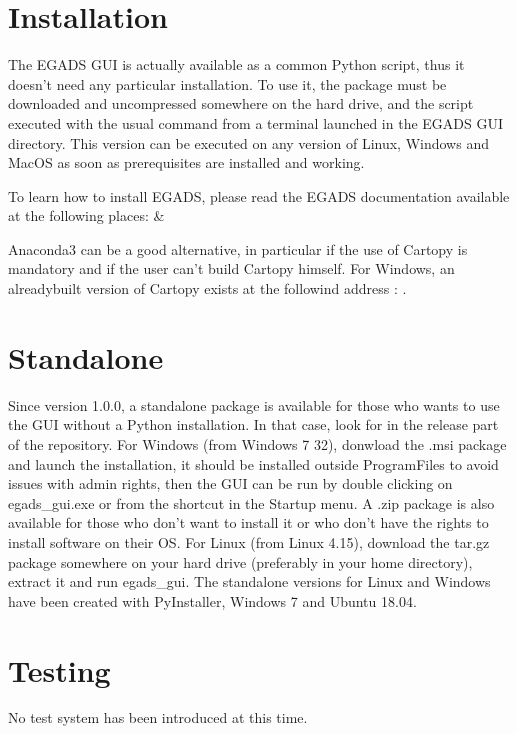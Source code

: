 \documentclass[a4paper,10pt,openany,english]{sphinxmanual}
\begin{document}
\section{Installation}
\label{\detokenize{install:id1}}
The EGADS GUI is actually available as a common Python script, thus it doesn’t need any particular installation. To use it, the package must be downloaded and uncompressed somewhere on the hard drive, and the script executed with the usual command  from a terminal launched in the EGADS GUI directory. This version can be executed on any version of Linux, Windows and MacOS as soon as prerequisites are installed and working.

To learn how to install EGADS, please read the EGADS documentation available at the following places:  \& 

Anaconda3 can be a good alternative, in particular if the use of Cartopy is mandatory and if the user can’t build Cartopy himself. For Windows, an already\sphinxhyphen{}built version of Cartopy exists at the followind address : .


\section{Stand\sphinxhyphen{}alone}
\label{\detokenize{install:stand-alone}}
Since version 1.0.0, a stand\sphinxhyphen{}alone package is available for those who wants to use the GUI without a Python installation. In that case, look for  in the release part of the repository. For Windows (from Windows 7 32), donwload the .msi package and launch the installation, it should be installed outside ProgramFiles to avoid issues with admin rights, then the GUI can be run by double clicking on egads\_gui.exe or from the shortcut in the Startup menu. A .zip package is also available for those who don’t want to install it or who don’t have the rights to install software on their OS. For Linux (from Linux 4.15), download the tar.gz package somewhere on your hard drive (preferably in your home directory), extract it and run egads\_gui.
The stand\sphinxhyphen{}alone versions for Linux and Windows have been created with PyInstaller, Windows 7 and Ubuntu 18.04.


\section{Testing}
\label{\detokenize{install:testing}}
No test system has been introduced at this time.
\end{document}
